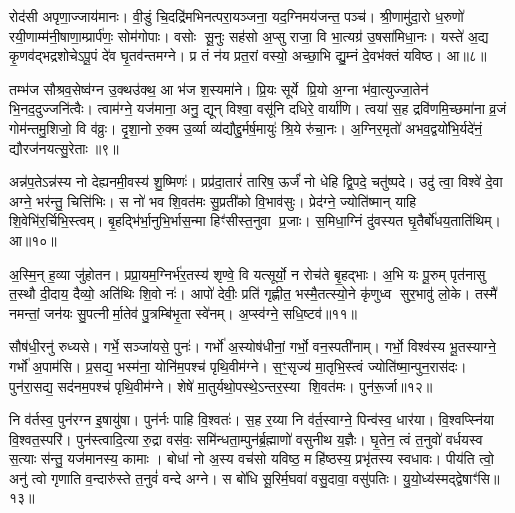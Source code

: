 रोद॑सी अपृणा॒ज्जाय॑मानः। वी॒डुं चि॒दद्रि॑मभिनत्परा॒यञ्जना॒ यद॒ग्निमय॑जन्त॒ पञ्च॑। श्री॒णामु॑दा॒रो ध॒रुणो॑ रयी॒णाम्म॑नी॒षाणा॒म्प्रार्प॑णः॒ सोम॑गोपाः। वसोः सू॒नुः सह॑सो अ॒प्सु राजा॒ वि भा॒त्यग्र॑ उ॒षसा॑मिधा॒नः। यस्ते॑ अ॒द्य कृ॒णव॑द्भद्रशोचेऽपू॒पं दे॑व घृ॒तव॑न्तमग्ने। प्र तं न॑य प्रत॒रां वस्यो॒ अच्छा॒भि द्यु॒म्नं दे॒वभ॑क्तं यविष्ठ। आ॥८॥

तम्भ॑ज सौश्रव॒सेष्व॑ग्न उ॒क्थउ॑क्थ॒ आ भ॑ज श॒स्यमा॑ने। प्रि॒यः सूर्ये प्रि॒यो अ॒ग्ना भ॑वा॒त्युज्जा॒तेन॑ भि॒नद॒दुज्जनि॑त्वैः। त्वाम॑ग्ने॒ यज॑माना॒ अनु॒ द्यून् विश्वा॒ वसू॑नि दधिरे॒ वार्या॑णि। त्वया॑ स॒ह द्रवि॑णमि॒च्छमा॑ना व्र॒जं गोम॑न्तमु॒शिजो॒ वि व॑व्रुः। दृ॒शा॒नो रु॒क्म उ॒र्व्या व्य॑द्यौद्दु॒र्मर्\mbox{}ष॒मायुः॑ श्रि॒ये रु॑चा॒नः। अ॒ग्निर॒मृतो॑ अभव॒द्वयो॑भि॒र्यदे॑नं॒ द्यौरज॑नयत्सु॒रेताः॥९॥

{\anuvakamend[{तृ॒तीये त्वा॒ गर्भ॒ आ य॑वि॒ष्ठा यच्च॒त्वारि॑ च॥२॥}]}

अन्न॑प॒तेऽन्न॑स्य नो देह्यनमी॒वस्य॑ शु॒ष्मिणः॑। प्रप्र॑दा॒तारं॑ तारिष॒ ऊर्जं॑ नो धेहि द्वि॒पदे॒ चतु॑ष्पदे। उदु॑ त्वा॒ विश्वे॑ दे॒वा अग्ने॒ भर॑न्तु॒ चित्ति॑भिः। स नो॑ भव शि॒वत॑मः सु॒प्रती॑को वि॒भाव॑सुः। प्रेद॑ग्ने॒ ज्योति॑ष्मान् याहि शि॒वेभि॑र॒र्चिभि॒स्त्वम्। बृ॒हद्भि॑र्भा॒नुभि॒र्भास॒न्मा हिꣳ॑सीस्त॒नुवा प्र॒जाः। स॒मिधा॒ग्निं दु॑वस्यत घृ॒तैर्बो॑धय॒ताति॑थिम्। आ॥१०॥

अ॒स्मि॒न् ह॒व्या जु॑होतन। प्रप्रा॒यम॒ग्निर्भ॑र॒तस्य॑ शृण्वे॒ वि यत्सूर्यो॒ न रोच॑ते बृ॒हद्भाः। अ॒भि यः पू॒रुम् पृत॑नासु त॒स्थौ दी॒दाय॒ दैव्यो॒ अति॑थिः शि॒वो नः॑। आपो॑ देवीः॒ प्रति॑ गृह्णीत॒ भस्मै॒तत्स्यो॒ने कृ॑णुध्व सुर॒भावु॑ लो॒के। तस्मै॑ नमन्तां॒ जन॑यः सु॒पत्नीर्मा॒तेव॑ पु॒त्रम्बि॑भृ॒ता स्वे॑नम्। अ॒प्स्व॑ग्ने॒ सधि॒ष्टव॑॥११॥

सौष॑धी॒रनु॑ रुध्यसे। गर्भे॒ सञ्जा॑यसे॒ पुनः॑। गर्भो॑ अ॒स्योष॑धीनां॒ गर्भो॒ वन॒स्पती॑नाम्। गर्भो॒ विश्व॑स्य भू॒तस्याग्ने॒ गर्भो॑ अ॒पाम॑सि। प्र॒सद्य॒ भस्म॑ना॒ योनि॑म॒पश्च॑ पृथि॒वीम॑ग्ने। स॒ꣳ॒सृज्य॑ मा॒तृभि॒स्त्वं ज्योति॑ष्मा॒न्पुन॒रास॑दः। पुन॑रा॒सद्य॒ सद॑नम॒पश्च॑ पृथि॒वीम॑ग्ने। शेषे॑ मा॒तुर्यथो॒पस्थे॒ऽन्तर॒स्या शि॒वत॑मः। पुन॑रू॒र्जा॥१२॥

नि व॑र्तस्व॒ पुन॑रग्न इ॒षायु॑षा। पुन॑र्नः पाहि वि॒श्वतः॑। स॒ह र॒य्या नि व॑र्त॒स्वाग्ने॒ पिन्व॑स्व॒ धार॑या। वि॒श्वप्स्नि॑या वि॒श्वत॒स्परि॑। पुन॑स्त्वादि॒त्या रु॒द्रा वस॑वः॒ समि॑न्धता॒म्पुन॑र्ब्र॒ह्माणो॑ वसुनीथ य॒ज्ञैः। घृ॒तेन॒ त्वं त॒नुवो॑ वर्धयस्व स॒त्याः स॑न्तु॒ यज॑मानस्य॒ कामाः। बोधा॑ नो अ॒स्य वच॑सो यविष्ठ॒ महि॑ष्ठस्य॒ प्रभृ॑तस्य स्वधावः। पीय॑ति त्वो॒ अनु॑ त्वो गृणाति व॒न्दारु॑स्ते त॒नुवं॑ वन्दे अग्ने। स बो॑धि सू॒रिर्म॒घवा॑ वसु॒दावा॒ वसु॑पतिः। यु॒यो॒ध्य॑स्मद्द्वेषाꣳ॑सि॥१३॥

